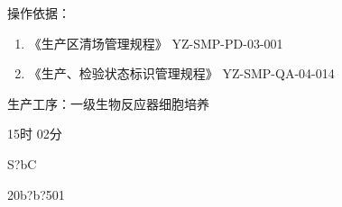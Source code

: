 \documentclass[UTF8,10pt,a4paper,fontset=fandol]{ctexart}
\newcommand{\fieldvalue}[1]{#1}
\newcommand{\handwritten}[1]{#1}
\begin{document}
操作依据：

\begin{enumerate}
\item 《生产区清场管理规程》 \hfill YZ-SMP-PD-03-001
\item 《生产、检验状态标识管理规程》 \hfill YZ-SMP-QA-04-014
\end{enumerate}

生产工序：一级生物反应器细胞培养

\fieldvalue{\handwritten{15时 02分}}

\fieldvalue{\handwritten{S?bC}}

\fieldvalue{\handwritten{20b?b?501}}
\end{document}
